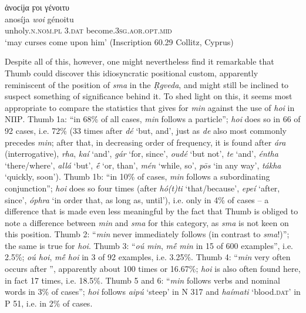 \begin{exe}
\ex ἀνοϲίϳα ϝοι γένοιτυ\\
\gll anosíja \emph{woi} génoitu\\
unholy.\textsc{n.nom.pl} \textsc{3.dat} become.\textsc{3sg.aor.opt.mid}\\
\trans `may curses come upon him' (Inscription 60.29 Collitz, Cyprus)
\label{Kypros60}
\end{exe}

Despite all of this, however, one might nevertheless find it remarkable that Thumb could discover this idiosyncratic positional custom, apparently reminiscent of the position of \emph{sma} in the \textit{\d{R}gveda}, and might still be inclined to suspect something of significance behind it. To shed light on this, it seems most appropriate to compare the statistics that \citet{Thumb1887} gives for \emph{min} against the use of \emph{hoi} in ΝΠΡ. Thumb 1a: ``in 68\% of all cases, \emph{min} follows a particle''; \emph{hoi} does so in 66 of 92 cases, i.e. 72\% (33 times after \emph{dé} `but, and', just as \emph{de} also most commonly precedes \emph{min}; after that, in decreasing order of frequency, it is found after \emph{ára} (interrogative), \emph{rha}, \emph{kaí} `and', \emph{gár} `for, since', \emph{oudé} `but not', \emph{te} `and', \emph{éntha} `there/where', \emph{allá} `but', \emph{ḗ} `or, than', \emph{mén} `while, so', \emph{pōs} `in any way', \emph{tákha} `quickly, soon'). Thumb 1b: ``in 10\% of cases, \emph{min} follows a subordinating conjunction''; \emph{hoi} does so four times (after \emph{hó(t)ti} `that/because', \emph{epeí} `after, since', \emph{óphra} `in order that, as long as, until'), i.e. only in 4\% of cases -- a difference that is made even less meaningful by the fact that Thumb is obliged to note a difference between \emph{min} and \emph{sma} for this category, as \emph{sma} is not keen on this position. Thumb 2: ``\emph{min} never immediately follows  (in contrast to \emph{sma}!)''; the same is true for \emph{hoi}. Thumb 3: ``\emph{oú min}, \emph{mḗ min} in 15 of 600 examples'', i.e. 2.5\%; \emph{oú hoi}, \emph{mḗ hoi} in 3 of 92 examples, i.e. 3.25\%. Thumb 4: ``\emph{min} very often occurs after '', apparently about 100 times or 16.67\%; \emph{hoi} is also often found here, in fact 17 times, i.e. 18.5\%. Thumb 5 and 6: ``\emph{min} follows verbs and nominal words in 3\% of cases''; \emph{hoi} follows \emph{aipú} `steep' in Ν 317 and \emph{haímati} `blood.\textsc{dat}' in Ρ 51, i.e. in 2\% of cases.

